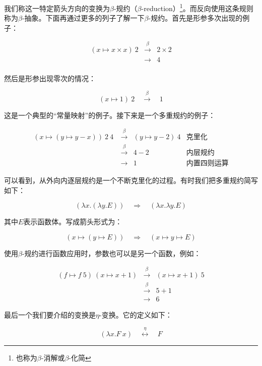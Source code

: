 \documentclass{article}
\begin{document}
我们称这一特定箭头方向的变换为$\beta$-规约（$\beta$-reduction）\footnote{也称为$\beta$-消解或$\beta$-化简}。而反向使用这条规则称为$\beta$-抽象。下面再通过更多的列子了解一下$\beta$-规约。首先是形参多次出现的例子：

\[
\begin{array}{rcl}
(x \mapsto x \times x)\ 2 & \overset{\beta}{\longrightarrow} & 2 \times 2 \\
                          & \longrightarrow & 4 \\
\end{array}
\]

然后是形参出现零次的情况：

\[
(x \mapsto 1)\ 2 \quad \overset{\beta}{\longrightarrow} \quad 1
\]

这是一个典型的“常量映射”的例子。接下来是一个多重规约的例子：

\[
\begin{array}{rcll}
(x \mapsto (y \mapsto y - x))\ 2\ 4\ & \overset{\beta}{\longrightarrow} & (y \mapsto y - 2)\ 4 & \text{克里化} \\
                                     & \overset{\beta}{\longrightarrow} & 4 - 2 & \text{内层规约} \\
                                     & \longrightarrow & 1 & \text{内置四则运算}
\end{array}
\]

可以看到，从外向内逐层规约是一个不断克里化的过程。有时我们把多重规约简写如下：

\[
(\lambda x . (\lambda y . E)) \quad \Rightarrow \quad (\lambda x . \lambda y . E)
\]

其中$E$表示函数体。写成箭头形式为：

\[
(x \mapsto (y \mapsto E)) \quad \Rightarrow \quad (x \mapsto y \mapsto E)
\]

使用$\beta$-规约进行函数应用时，参数也可以是另一个函数，例如：

\[
\begin{array}{rcl}
(f \mapsto f\ 5)\ (x \mapsto x + 1) & \overset{\beta}{\longrightarrow} & (x \mapsto x + 1)\ 5 \\
                                    & \overset{\beta}{\longrightarrow} & 5 + 1 \\
                                    & \longrightarrow & 6
\end{array}
\]

最后一个我们要介绍的变换是$\eta$-变换。它的定义如下：

\[
(\lambda x . F\ x) \quad \overset{\eta}{\longleftrightarrow} \quad F
\]
\end{document}
